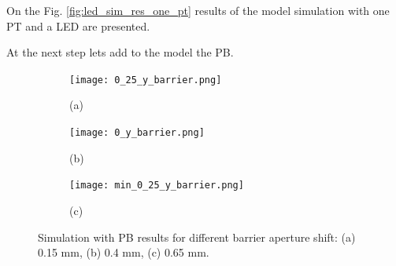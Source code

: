 On the Fig. \ref*{fig:led_sim_res_one_pt} results of the model simulation with one PT and a LED are presented.

At the next step lets add to the model the PB.




\begin{figure}[H]

\end{figure}

\begin{figure}[H]
  \centering
  \begin{subfigure}[b]{0.3\textwidth}
    \texttt{[image: 0\_25\_y\_barrier.png]}
    \centering
    \label{fig:0_25_y_barrier}
    \caption*{(a)}
  \end{subfigure}
  \begin{subfigure}[b]{0.3\textwidth}
    \texttt{[image: 0\_y\_barrier.png]}
    \label{fig:0_y_barrier}
    \caption*{(b)}
  \end{subfigure}
  \begin{subfigure}[b]{0.3\textwidth}
    \texttt{[image: min\_0\_25\_y\_barrier.png]}
    \label{fig:min_0_25_y_barrier}
    \caption*{(c)}
  \end{subfigure}
  \caption{Simulation with PB results for different barrier aperture shift: (a) 0.15 mm, (b) 0.4 mm, (c) 0.65 mm.}
  \label{fig:LED_PT_sim_bar}
\end{figure}

    
    



